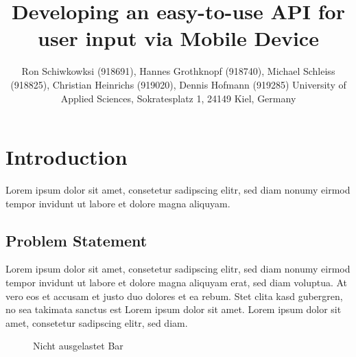 \documentclass[a4paper]{spie}  %
\title{Developing an easy-to-use API for user input via Mobile Device}
\author{ Ron Schiwkowksi  (918691), Hannes Grothknopf (918740), Michael Schleiss (918825), Christian Heinrichs (919020), Dennis Hofmann (919285)
\skiplinehalf
University of Applied Sciences, Sokratesplatz 1, 24149 Kiel, Germany
}
\begin{document}
 
  \maketitle 
\begin{abstract}
\end{abstract}


\section{Introduction}
Lorem ipsum dolor sit amet, consetetur sadipscing elitr, sed diam nonumy eirmod tempor invidunt ut labore et dolore magna aliquyam.

\subsection{Problem Statement}
Lorem ipsum dolor sit amet, consetetur sadipscing elitr, sed diam nonumy eirmod tempor invidunt ut labore et dolore magna aliquyam erat, sed diam voluptua. At vero eos et accusam et justo duo dolores et ea rebum. Stet clita kasd gubergren, no sea takimata sanctus est Lorem ipsum dolor sit amet. Lorem ipsum dolor sit amet, consetetur sadipscing elitr, sed diam.
\begin{figure}[h!]
	\centering
		\caption{Nicht ausgelastet Bar}
		\label{fig:bar1}
\end{figure}
\end{document}
